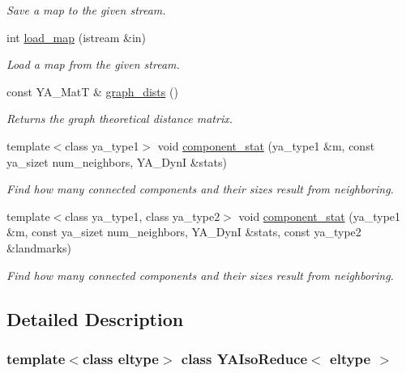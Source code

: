 \begin{CompactItemize}
\begin{CompactList}\small\item\em Save a map to the given stream. \item\end{CompactList}\item 
\hypertarget{class_y_a_iso_reduce_a13}{
int \hyperlink{class_y_a_iso_reduce_a13}{load\_\-map} (istream \&in)}
\label{class_y_a_iso_reduce_a13}

\begin{CompactList}\small\item\em Load a map from the given stream. \item\end{CompactList}\item 
\hypertarget{class_y_a_iso_reduce_a14}{
const YA\_\-Mat\-T \& \hyperlink{class_y_a_iso_reduce_a14}{graph\_\-dists} ()}
\label{class_y_a_iso_reduce_a14}

\begin{CompactList}\small\item\em Returns the graph theoretical distance matrix. \item\end{CompactList}\item 
template$<$class ya\_\-type1$>$ void \hyperlink{class_y_a_iso_reduce_a15}{component\_\-stat} (ya\_\-type1 \&m, const ya\_\-sizet num\_\-neighbors, YA\_\-Dyn\-I \&stats)
\begin{CompactList}\small\item\em Find how many connected components and their sizes result from neighboring. \item\end{CompactList}\item 
template$<$class ya\_\-type1, class ya\_\-type2$>$ void \hyperlink{class_y_a_iso_reduce_a16}{component\_\-stat} (ya\_\-type1 \&m, const ya\_\-sizet num\_\-neighbors, YA\_\-Dyn\-I \&stats, const ya\_\-type2 \&landmarks)
\begin{CompactList}\small\item\em Find how many connected components and their sizes result from neighboring. \item\end{CompactList}\end{CompactItemize}


\subsection{Detailed Description}
\subsubsection*{template$<$class eltype$>$ class YAIso\-Reduce$<$ eltype $>$}

